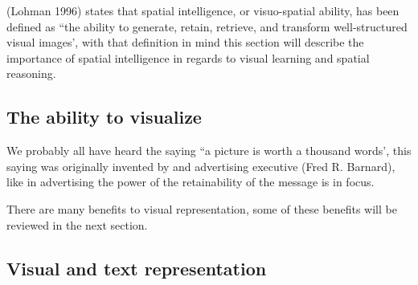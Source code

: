(Lohman 1996) states that spatial intelligence, or visuo-spatial ability, has been defined as ``the ability to generate, retain, retrieve, and transform well-structured visual images'\cite[p97]{tapsfield1996}, with that definition in mind this section will describe the importance of spatial intelligence in regards to visual learning and spatial reasoning.


\subsection{The ability to visualize}\label{ch:the_ability_to_visualize}
We probably all have heard the saying ``a picture is worth a thousand words', this saying was originally invented by and advertising executive (Fred R. Barnard)\cite*{phrases2022}, like in advertising the power of the retainability of the message is in focus. 



There are many benefits to visual representation, some of these benefits will be reviewed in the next section.
\subsection{Visual and text representation}\label{ch:visual_and_text_representation}





